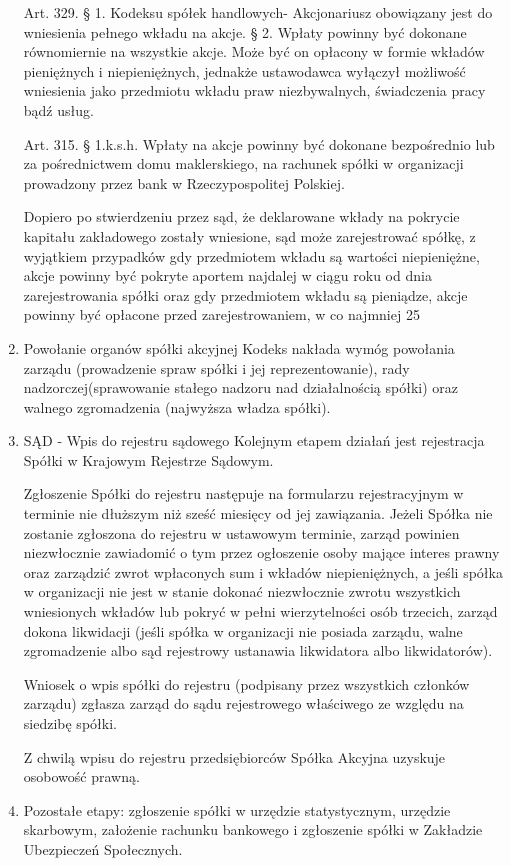 \documentclass[a4paper, 11pt]{article}
\begin{document}
\begin{enumerate}
Art. 329. § 1. Kodeksu spółek handlowych- Akcjonariusz obowiązany jest do wniesienia pełnego wkładu na akcje. § 2. Wpłaty powinny być dokonane równomiernie na wszystkie akcje. Może być on opłacony w formie wkładów pieniężnych i niepieniężnych, jednakże ustawodawca wyłączył możliwość wniesienia jako przedmiotu wkładu praw niezbywalnych, świadczenia pracy bądź usług.

Art. 315. § 1.k.s.h. Wpłaty na akcje powinny być dokonane bezpośrednio lub za pośrednictwem domu maklerskiego, na rachunek spółki w organizacji prowadzony przez bank w Rzeczypospolitej Polskiej.

Dopiero po stwierdzeniu przez sąd, że deklarowane wkłady na pokrycie kapitału zakładowego zostały wniesione, sąd może zarejestrować spółkę, z wyjątkiem przypadków gdy przedmiotem wkładu są wartości niepieniężne, akcje powinny być pokryte aportem najdalej w ciągu roku od dnia zarejestrowania spółki oraz gdy przedmiotem wkładu są pieniądze, akcje powinny być opłacone przed zarejestrowaniem, w co najmniej 25%

\item Powołanie organów spółki akcyjnej
Kodeks nakłada wymóg powołania zarządu (prowadzenie spraw spółki i jej reprezentowanie), rady nadzorczej(sprawowanie stałego nadzoru nad działalnością spółki) oraz walnego zgromadzenia (najwyższa władza spółki).

\item SĄD - Wpis do rejestru sądowego 
Kolejnym etapem działań jest rejestracja Spółki w Krajowym Rejestrze Sądowym.
 
Zgłoszenie Spółki do rejestru następuje na formularzu rejestracyjnym w terminie nie dłuższym niż sześć miesięcy od jej zawiązania. Jeżeli Spółka nie zostanie zgłoszona do rejestru w ustawowym terminie, zarząd powinien niezwłocznie zawiadomić o tym przez ogłoszenie osoby mające interes prawny oraz zarządzić zwrot wpłaconych sum i wkładów niepieniężnych, a jeśli spółka w organizacji nie jest w stanie dokonać niezwłocznie zwrotu wszystkich wniesionych wkładów lub pokryć w pełni wierzytelności osób trzecich, zarząd dokona likwidacji (jeśli spółka w organizacji nie posiada zarządu, walne zgromadzenie albo sąd rejestrowy ustanawia likwidatora albo likwidatorów).
 
Wniosek o wpis spółki do rejestru (podpisany przez wszystkich członków zarządu) zgłasza zarząd do sądu rejestrowego właściwego ze względu na siedzibę spółki.
 
Z chwilą wpisu do rejestru przedsiębiorców Spółka Akcyjna uzyskuje osobowość prawną.

\item Pozostałe etapy:
zgłoszenie spółki w urzędzie statystycznym,
urzędzie skarbowym,
założenie rachunku bankowego i zgłoszenie spółki w Zakładzie Ubezpieczeń Społecznych.

\end{enumerate}
\end{document}
